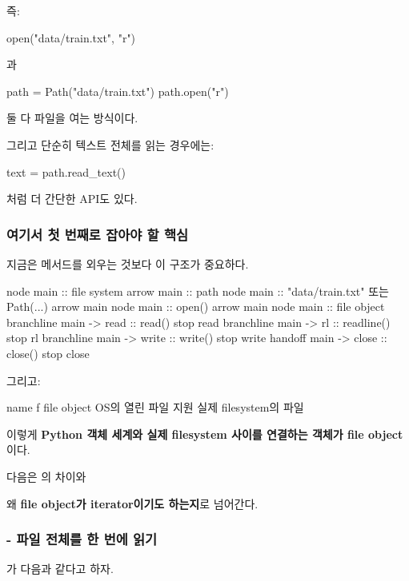 즉:

\begin{dhkcode}
open("data/train.txt", "r")
\end{dhkcode}

과

\begin{dhkcode}
path = Path("data/train.txt")
path.open("r")
\end{dhkcode}

둘 다 파일을 여는 방식이다.

그리고 단순히 텍스트 전체를 읽는 경우에는:

\begin{dhkcode}
text = path.read_text()
\end{dhkcode}

처럼 더 간단한 API도 있다.

\subsubsection{여기서 첫 번째로 잡아야 할 핵심}

지금은 메서드를 외우는 것보다 이 구조가 중요하다.

\begin{dhkbranch}[in=8]
node main :: file system
arrow main :: path
node main :: "data/train.txt" 또는 Path(...)
arrow main
node main :: open()
arrow main
node main :: file object
branchline main -> read :: read()
stop read
branchline main -> rl :: readline()
stop rl
branchline main -> write :: write()
stop write
handoff main -> close :: close()
stop close
\end{dhkbranch}

그리고:

\begin{dhksmry}[centered]
name f
\da
file object
\da
OS의 열린 파일 지원
\da
실제 filesystem의 파일
\end{dhksmry}

이렇게 \textbf{Python 객체 세계와 실제 filesystem 사이를 연결하는 객체가 file object}이다.

다음은 의 차이와

왜 \textbf{file object가 iterator이기도 하는지}로 넘어간다.

\subsubsection{ - 파일 전체를 한 번에 읽기}

가 다음과 같다고 하자.

